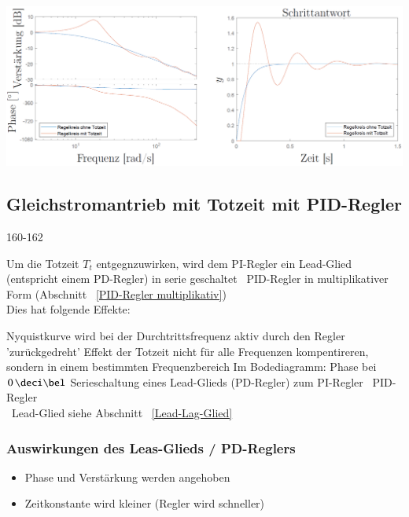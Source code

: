 \includegraphics[width=\columnwidth]{images/gleichstromantrieb_pi-regler_totzeit_step_response.png}


\subsection{Gleichstromantrieb mit Totzeit mit PID-Regler}{160-162}

Um die Totzeit $T_t$ entgegnzuwirken, wird dem PI-Regler ein Lead-Glied (entspricht einem PD-Regler) in serie geschaltet 
\textrightarrow\ PID-Regler in multiplikativer Form (Abschnitt ~\ref{PID-Regler multiplikativ}) \\

Dies hat folgende Effekte:

\begin{outline}
    \1 Nyquistkurve wird bei der Durchtrittsfrequenz aktiv durch den Regler 'zurückgedreht' 
        \2 Effekt der Totzeit nicht für alle Frequenzen kompentireren, sondern in einem bestimmten Frequenzbereich
        \2 Im Bodediagramm: Phase bei $0 \, \deci \bel$ 
    \1 Serieschaltung eines Lead-Glieds (PD-Regler) zum PI-Regler \textrightarrow\ PID-Regler \\
        \textrightarrow\ Lead-Glied siehe Abschnitt ~\ref{Lead-Lag-Glied}
\end{outline}


\subsubsection{Auswirkungen des Leas-Glieds / PD-Reglers}

\begin{itemize}
    \item Phase und Verstärkung werden angehoben
    \item Zeitkonstante wird kleiner (Regler wird schneller)
\end{itemize}

